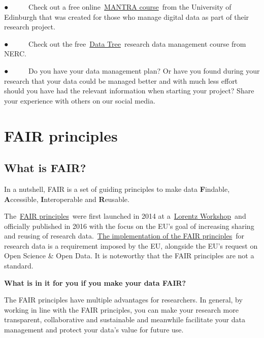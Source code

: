 \documentclass[
]{book}
\begin{document}
● ~ ~ ~ Check out a free online~\href{https://mantra.ed.ac.uk/}{}\href{https://mantra.ed.ac.uk/}{MANTRA course}~from the University of Edinburgh that was created for those who manage digital data as part of their research project.

● ~ ~ ~ Check out the free~\href{https://datatree.org.uk/}{}\href{https://datatree.org.uk/}{Data Tree}~research data management course from NERC.

● ~ ~ ~ Do you have your data management plan? Or have you found during your research that your data could be managed better and with much less effort should you have had the relevant information when starting your project? Share your experience with others on our social media.

\hypertarget{fair-principles}{%
\chapter{\texorpdfstring{\textbf{FAIR principles}}{FAIR principles}}\label{fair-principles}}

\hypertarget{what-is-fair}{%
\section{\texorpdfstring{\textbf{What is FAIR?}}{What is FAIR?}}\label{what-is-fair}}

In a nutshell, FAIR is a set of guiding principles to make data \textbf{F}indable, \textbf{A}ccessible, \textbf{I}nteroperable and \textbf{R}eusable.

The~\href{https://www.go-fair.org/fair-principles/}{}\href{https://www.go-fair.org/fair-principles/}{FAIR principles}~were first launched in 2014 at a~\href{https://www.lorentzcenter.nl/}{}\href{https://www.lorentzcenter.nl/}{Lorentz Workshop}~and officially published in 2016 with the focus on the EU's goal of increasing sharing and reusing of research data.~\href{https://eur-lex.europa.eu/legal-content/EN/TXT/?uri=uriserv:OJ.L_.2019.172.01.0056.01.ENG}{}\href{https://eur-lex.europa.eu/legal-content/EN/TXT/?uri=uriserv:OJ.L_.2019.172.01.0056.01.ENG}{The implementation of the FAIR principles}~for research data is a requirement imposed by the EU, alongside the EU's request on Open Science \& Open Data. It is noteworthy that the FAIR principles are not a standard.

\textbf{What is in it for you if you make your data FAIR?}

The FAIR principles have multiple advantages for researchers. In general, by working in line with the FAIR principles, you can make your research more transparent, collaborative and sustainable and meanwhile facilitate your data management and protect your data's value for future use.
\end{document}
